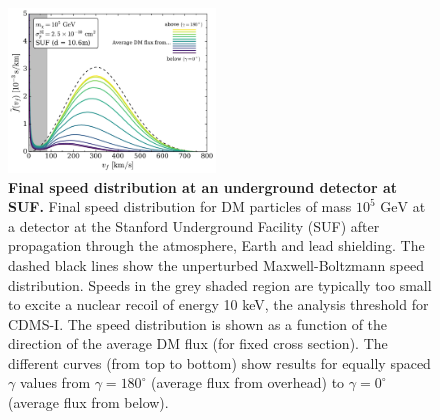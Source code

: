 \documentclass[prd,twocolumn,showpacs,nofootinbib,aps]{revtex4-1}
\begin{document}
\begin{figure}[t]
\centering
\includegraphics[width=0.49\textwidth,]{plots/SpeedDists_gamma.pdf}
\caption{\textbf{Final speed distribution at an underground detector at SUF.} Final speed distribution for DM particles of mass $10^5 \,\,\mathrm{GeV}$ at a detector at the Stanford Underground Facility (SUF) after propagation through the atmosphere, Earth and lead shielding. The dashed black lines show the unperturbed Maxwell-Boltzmann speed distribution. Speeds in the grey shaded region are typically too small to excite a nuclear recoil of energy 10 keV, the analysis threshold for CDMS-I. The speed distribution is shown as a function of the direction of the average DM flux (for fixed cross section). The different curves (from top to bottom) show results for equally spaced $\gamma$ values from $\gamma = 180^\circ$ (average flux from overhead) to $\gamma = 0^\circ$ (average flux from below).}
\label{fig:SpeedDists_gamma}
\end{figure}
\end{document}
